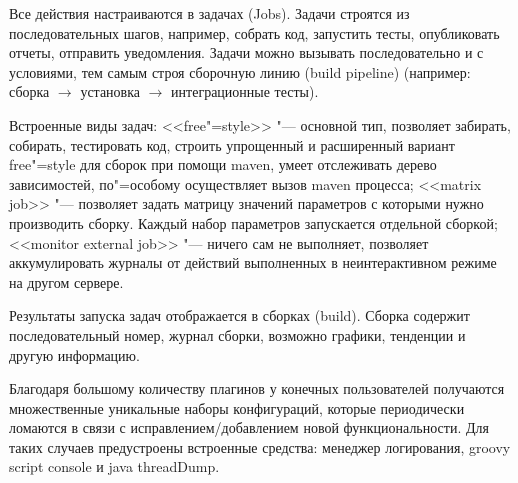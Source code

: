 \documentclass[10pt, a5paper]{article}
\begin{document}
Все действия настраиваются в задачах (Jobs). Задачи строятся из последовательных шагов, например, собрать код, запустить тесты, опубликовать отчеты, отправить уведомления. Задачи можно вызывать последовательно и с условиями, тем самым строя сборочную линию (build pipeline) (например: сборка $\rightarrow{}$ установка $\rightarrow{}$ интеграционные тесты).

Встроенные виды задач:  <<free"=style>> "--- основной тип, позволяет забирать, собирать, тестировать код, строить упрощенный и расширенный вариант free"=style для сборок при помощи maven, умеет отслеживать дерево зависимостей, по"=особому осуществляет вызов maven процесса; <<matrix job>>  "--- позволяет задать матрицу значений параметров с которыми нужно производить сборку. Каждый набор параметров запускается отдельной сборкой; <<monitor external job>> "--- ничего сам не выполняет, позволяет аккумулировать журналы от действий выполненных  в неинтерактивном режиме на другом сервере.

Результаты запуска задач отображается в сборках (build). Сборка содержит последовательный номер, журнал сборки, возможно графики, тенденции и другую информацию.

Благодаря большому количеству плагинов у конечных пользователей получаются множественные уникальные наборы конфигураций, которые периодически ломаются в связи с исправлением/добавлением новой функциональности. Для таких случаев предустроены встроенные средства: менеджер логирования, groovy script console и java threadDump.
\end{document}
